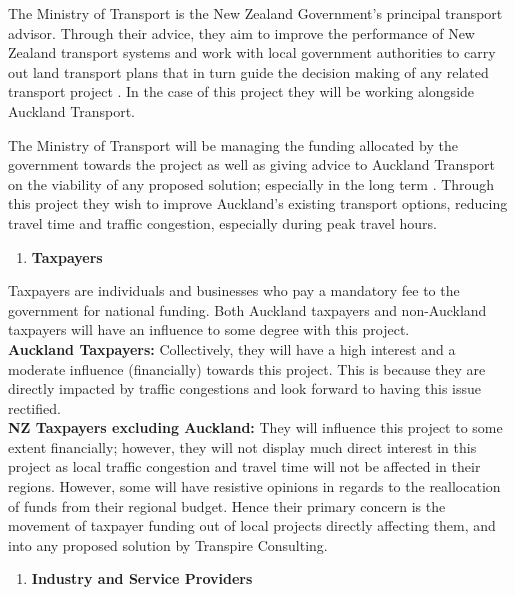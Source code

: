 \documentclass[twoside, a4paper, 11pt]{article}
\begin{document}
The Ministry of Transport is the New Zealand Government's principal transport advisor. Through their advice, they aim to improve the performance of New Zealand transport systems and work with local government authorities to carry out land transport plans that in turn guide the decision making of any related transport project \citep{mot17}. In the case of this project they will be working alongside Auckland Transport.

The Ministry of Transport will be managing the funding allocated by the government towards the project as well as giving advice to Auckland Transport on the viability of any proposed solution; especially in the long term \citep{mot17_2}. Through this project they wish to improve Auckland's existing transport options, reducing travel time and traffic congestion, especially during peak travel hours.


\begin{enumerate}[label=\textbf{\arabic*}),leftmargin=0in,resume]
\item \textbf{Taxpayers}
\end{enumerate}

Taxpayers are individuals and businesses who pay a mandatory fee to the government for national funding. Both Auckland taxpayers and non-Auckland taxpayers will have an influence to some degree with this project.\\

\textbf{Auckland Taxpayers:} Collectively, they will have a high interest and a moderate influence (financially) towards this project. This is because they are directly impacted by traffic congestions and look forward to having this issue rectified.\\

\textbf{NZ Taxpayers excluding Auckland:} They will influence this project to some extent financially; however, they will not display much direct interest in this project as local traffic congestion and travel time will not be affected in their regions. However, some will have resistive opinions in regards to the reallocation of funds from their regional budget. Hence their primary concern is the movement of taxpayer funding out of local projects directly affecting them, and into any proposed solution by Transpire Consulting.


\begin{enumerate}[label=\textbf{\arabic*}),leftmargin=0in,resume]
\item \textbf{Industry and Service Providers}
\end{enumerate}
\end{document}
